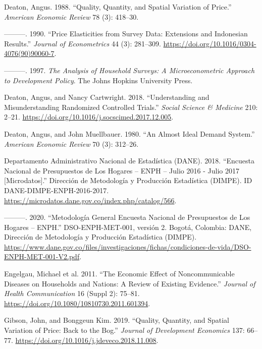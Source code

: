 \documentclass[
  11pt,
]{article}
\newlength{\cslhangindent}
\newenvironment{CSLReferences}[2] %
 {\begin{list}{}{%
  \setlength{\itemindent}{0pt}
  \setlength{\leftmargin}{0pt}
  \setlength{\parsep}{0pt}
  \ifodd #1
   \setlength{\leftmargin}{\cslhangindent}
   \setlength{\itemindent}{-1\cslhangindent}
  \fi
  \setlength{\itemsep}{#2\baselineskip}}}
 {\end{list}}
\begin{document}
\begin{CSLReferences}{1}{0}
Deaton, Angus. 1988. {``Quality, Quantity, and Spatial Variation of
Price.''} \emph{American Economic Review} 78 (3): 418--30.

---------. 1990. {``Price Elasticities from Survey Data: Extensions and
{Indonesian} Results.''} \emph{Journal of Econometrics} 44 (3):
281--309. \url{https://doi.org/10.1016/0304-4076(90)90060-7}.

---------. 1997. \emph{The Analysis of Household Surveys: A
Microeconometric Approach to Development Policy}. The Johns Hopkins
University Press.

Deaton, Angus, and Nancy Cartwright. 2018. {``Understanding and
Misunderstanding Randomized Controlled Trials.''} \emph{Social Science
\& Medicine} 210: 2--21.
\url{https://doi.org/10.1016/j.socscimed.2017.12.005}.

Deaton, Angus, and John Muellbauer. 1980. {``An Almost Ideal Demand
System.''} \emph{American Economic Review} 70 (3): 312--26.

Departamento Administrativo Nacional de Estadística (DANE). 2018.
{``Encuesta Nacional de Presupuestos de Los Hogares -- {ENPH} -- Julio
2016 - Julio 2017 {[}Microdatos{]}.''} Direcci{ó}n de Metodolog{í}a y
Producci{ó}n Estad{í}stica (DIMPE). ID DANE-DIMPE-ENPH-2016-2017.
\url{https://microdatos.dane.gov.co/index.php/catalog/566}.

---------. 2020. {``Metodolog{í}a General Encuesta Nacional de
Presupuestos de Los Hogares -- {ENPH}.''} DSO-ENPH-MET-001, versi{ó}n 2.
Bogot{á}, Colombia: DANE, Direcci{ó}n de Metodolog{í}a y Producci{ó}n
Estad{í}stica (DIMPE).
\url{https://www.dane.gov.co/files/investigaciones/fichas/condiciones-de-vida/DSO-ENPH-MET-001-V2.pdf}.

Engelgau, Michael et al. 2011. {``The Economic Effect of Noncommunicable
Diseases on Households and Nations: A Review of Existing Evidence.''}
\emph{Journal of Health Communication} 16 (Suppl 2): 75--81.
\url{https://doi.org/10.1080/10810730.2011.601394}.

Gibson, John, and Bonggeun Kim. 2019. {``Quality, Quantity, and Spatial
Variation of Price: Back to the Bog.''} \emph{Journal of Development
Economics} 137: 66--77.
\url{https://doi.org/10.1016/j.jdeveco.2018.11.008}.


\end{CSLReferences}
\end{document}
